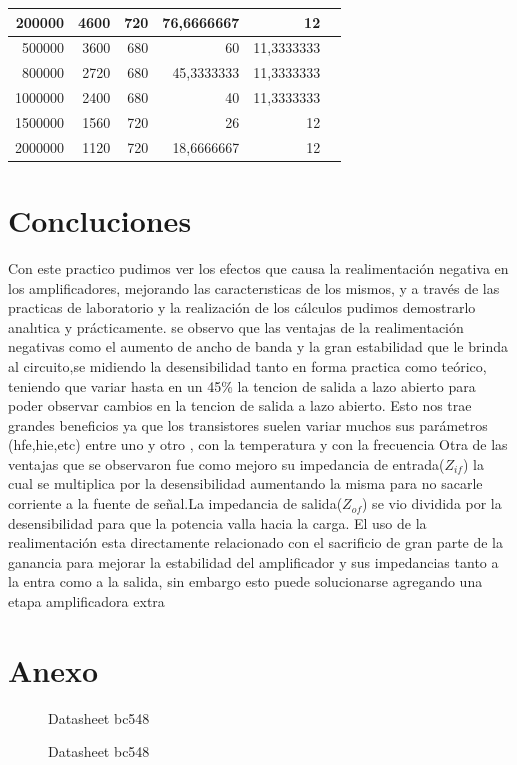 \documentclass[12pt, letterpaper]{article}
\begin{document}
\begin{table}[H]
\begin{tabular}{|r|r|r|r|r|r}
    \cmidrule   200000 & 4600  & 720   & 76,6666667 & 12    &  \\
    
    \cmidrule   500000 & 3600  & 680   & 60    & 11,3333333 &  \\
    
    \cmidrule    800000 & 2720  & 680   & 45,3333333 & 11,3333333 &  \\
    
    \cmidrule    1000000 & 2400  & 680   & 40    & 11,3333333 &  \\
    \cmidrule   1500000 & 1560  & 720   & 26    & 12    &  \\
    \cmidrule    2000000 & 1120  & 720   & 18,6666667 & 12    &  \\
    \cmidrule    
    \end{tabular}
    \label{tab:tab_resp_frec}
\end{table}

\section{Concluciones}
Con este practico pudimos ver los efectos que causa la realimentación negativa en los amplificadores, mejorando las caracterısticas de los mismos, y a través de las practicas de laboratorio y la realización de los cálculos pudimos demostrarlo analıtica y prácticamente.
\singlespacing
se observo que las ventajas de la realimentación negativas como el aumento de ancho de banda y la gran estabilidad que le brinda al circuito,se midiendo la desensibilidad tanto en forma practica como teórico, teniendo que variar hasta en un 45\% la tencion de salida a lazo abierto para poder observar cambios en la tencion de salida a lazo abierto. Esto nos trae grandes beneficios ya que los transistores suelen variar muchos sus parámetros (hfe,hie,etc) entre uno y otro , con la temperatura y con la frecuencia 
\singlespacing
Otra de las ventajas que se observaron fue como mejoro su impedancia de entrada($Z_{if}$) la cual se multiplica por la desensibilidad aumentando la misma para no sacarle corriente a la fuente de señal.La impedancia de salida($Z_{of}$) se vio dividida por la desensibilidad para que la potencia valla hacia la carga.
\singlespacing
El uso de la realimentación esta directamente relacionado con el sacrificio de gran parte de la ganancia para mejorar la estabilidad del amplificador y sus impedancias tanto a la entra como a la salida, sin embargo esto puede solucionarse agregando una etapa amplificadora extra
\newpage
\section{Anexo}
\begin{figure}[H]
    \centering
    
    \caption{Datasheet bc548}
    \label{fig:datasheet_bc548}
\end{figure}
\newpage
\begin{figure}[H]
    \centering
    
    \caption{Datasheet bc548}
\end{figure}


\label{LastPage}
\end{document}
